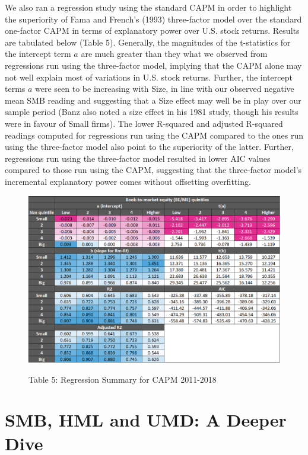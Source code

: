 \documentclass[12pt]{article}
\begin{document}
\noindent We also ran a regression study using the standard CAPM in order to highlight the superiority of Fama and French's (1993) three-factor model over the standard one-factor CAPM in terms of explanatory power over U.S. stock returns. Results are tabulated below (Table 5). Generally, the magnitudes of the t-statistics for the intercept term $a$ are much greater than they what we observed from regressions run using the three-factor model, implying that the CAPM alone may not well explain most of variations in U.S. stock returns. Further, the intercept terms $a$ were seen to be increasing with Size, in line with our observed negative mean SMB reading and suggesting that a Size effect may well be in play over our sample period (Banz also noted a size effect in his 1981 study, though his results were in favour of Small firms). The lower R-squared and adjusted R-squared readings computed for regressions run using the CAPM compared to the ones run using the three-factor model also point to the superiority of the latter. Further, regressions run using the three-factor model resulted in lower AIC values compared to those run using the CAPM, suggesting that the three-factor model's incremental explanatory power comes without offsetting overfitting.

\begin{figure}[h]
	\centering
	\caption*{Table 5: Regression Summary for CAPM 2011-2018}
	\includegraphics[width=0.9\linewidth]{A6.png}
	\label{fig:label}
\end{figure}

\newpage

\section{SMB, HML and UMD: A Deeper Dive}
\end{document}
